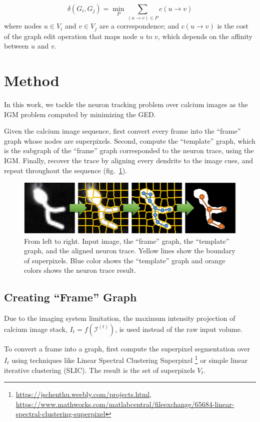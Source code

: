\documentclass{article}
\begin{document}
\begin{equation} \label{eq:ged}
\delta(G_i, G_j) = \min_P \sum_{(u \rightarrow v) \in P} c(u \rightarrow v)
\end{equation}
where nodes $u \in V_i$ and $v \in V_j$ are a correspondence; and $c(u \rightarrow v)$ is the cost of the graph edit operation that maps node $u$ to $v$, which depends on the affinity between $u$ and $v$.

\section{Method}
In this work, we tackle the neuron tracking problem over calcium images as the IGM problem computed by minimizing the GED.

Given the calcium image sequence, first convert every frame into the ``frame'' graph whose nodes are superpixels. Second, compute the ``template'' graph, which is the subgraph of the ``frame'' graph corresponded to the neuron trace, using the IGM. Finally, recover the trace by aligning every dendrite to the image cues, and repeat throughout the sequence (fig.~\ref{fig:method}).

\begin{figure}[b!]
	\centering
	\includegraphics[width=\columnwidth]{img/method.png}
	\caption{\small{From left to right. Input image, the ``frame'' graph, the ``template'' graph, and the aligned neuron trace. Yellow lines show the boundary of superpixels. Blue color shows the ``template'' graph and orange colors shows the neuron trace result.}}
	\label{fig:method}
	\vspace{-10pt}
\end{figure}


\subsection{Creating ``Frame'' Graph}
Due to the imaging system limitation, the maximum intensity projection of calcium image stack, $I_t = f(\mathcal{I}^{(t)})$, is used instead of the raw input volume. 

To convert a frame into a graph, first compute the superpixel segmentation over $I_t$ using techniques like Linear Spectral Clustering Superpixel \cite{li2015, chen2017}\footnote{\url{https://jschenthu.weebly.com/projects.html},\\ \url{https://www.mathworks.com/matlabcentral/fileexchange/65684-linear-spectral-clustering-superpixel}} or simple linear iterative clustering (SLIC). The result is the set of superpixels $V_t$. 
\end{document}
